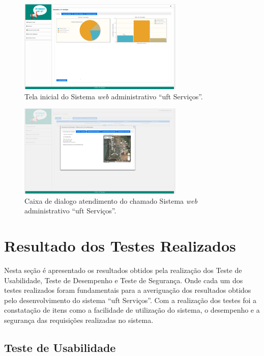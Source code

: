 \begin{figure}[H]
  \centering
  \includegraphics[width=0.7\textwidth]{figuras/web-telainicial-uftservicos.png} 
  \caption{Tela inicial do Sistema \textit{web} administrativo ``\acrshort{uft} Serviços''.}
  \label{web-start} 
\end{figure}

\begin{figure}[H]
  \centering
  \includegraphics[width=0.7\textwidth]{figuras/web-atendimento.png} 
  \caption{Caixa de dialogo atendimento do chamado Sistema \textit{web} administrativo ``\acrshort{uft} Serviços''.}
  \label{web-atendimento} 
\end{figure}

\section{Resultado dos Testes Realizados}

\noindent Nesta seção é apresentado os resultados obtidos pela realização dos Teste de Usabilidade, Teste de Desempenho e Teste de Segurança. Onde cada um dos testes realizados foram fundamentais para a averiguação dos resultados obtidos pelo desenvolvimento do sistema ``\acrshort{uft} Serviços''. Com a realização dos testes foi a constatação de itens como a facilidade de utilização do sistema, o desempenho e a segurança das requisições realizadas no sistema.

\subsection*{Teste de Usabilidade}

